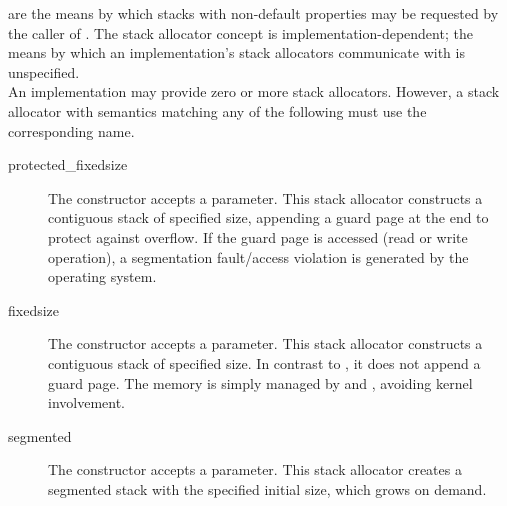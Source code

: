 
are the means by which stacks with non-default properties may be requested by
the caller of \callcc. The stack allocator concept is implementation-dependent;
the means by which an implementation's stack allocators communicate with \callcc
is unspecified.\\

An implementation may provide zero or more stack allocators. However, a stack
allocator with semantics matching any of the following must use the
corresponding name.
\begin{description}
  \item[protected\_fixedsize] The constructor accepts a  parameter.
        This stack allocator constructs a contiguous stack of specified size,
        appending a guard page at the end to protect against overflow. If the
        guard page is accessed (read or write operation), a segmentation
        fault/access violation is generated by the operating system.
  \item[fixedsize] The constructor accepts a  parameter.
        This stack allocator constructs a contiguous stack of specified size.
        In contrast to , it does not append a guard
        page. The memory is simply managed by 
        and , avoiding kernel involvement.
  \item[segmented] The constructor accepts a  parameter.
        This stack allocator creates a segmented stack\cite{gccsplit} with the
        specified initial size, which grows on demand.
\end{description}

